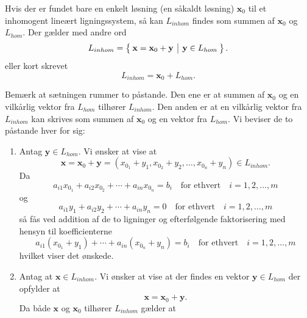 \begin{theorem}[Struktursætningen]\label{TN2.23b}
Hvis der er fundet bare en enkelt løsning (en såkaldt  løsning) $\mathbf x_0$ til et inhomogent lineært ligningssystem, så kan $L_{inhom}$ findes som summen af $\mathbf x_0$ og  $L_{hom}$.\bs
Der gælder med andre ord
\begin{equation}
L_{inhom}=\left\lbrace \hspace*{-1mm} \begin{array}{c|c} \mathbf x=\mathbf x_0+\mathbf y & \mathbf y \in L_{hom} \end{array} \hspace*{-1mm} \right\rbrace.
\end{equation}
eller kort skrevet
\begin{equation}\label{TN2.24}
L_{inhom}=\mathbf x_0+L_{hom}.
\end{equation}
\end{theorem}

\begin{bevis}
Bemærk at sætningen rummer to påstande. Den ene er at summen af $\mathbf x_0$ og en vilkårlig vektor fra $L_{hom}$ tilhører $L_{inhom}$. Den anden er at en vilkårlig vektor fra $L_{inhom}$ kan skrives som summen af $\mathbf x_0$ og en vektor fra $L_{hom}$. Vi beviser de to påstande hver for sig:
\begin{enumerate}
\item
Antag $\mathbf y \in L_{hom}$. Vi ønsker at vise at 
\begin{equation}
\mathbf x=\mathbf x_0+\mathbf y=(x_{0_1}+y_1, x_{0_2}+y_2,\ldots ,x_{0_n}+y_n) \in L_{inhom}.
\end{equation}
Da
\begin{equation}
a_{i1}x_{0_1}+a_{i2}x_{0_2}+ \cdots + a_{in}x_{0_n}=b_i \quad \textrm{for ethvert}\quad i=1,2,\ldots,m
\end{equation}
og
\begin{equation}
a_{i1}y_{1}+a_{i2}y_{2}+ \cdots + a_{in}y_{n}=0 \quad \textrm{for ethvert}\quad i=1,2,\ldots,m
\end{equation}
så fås ved addition af de to ligninger og efterfølgende faktorisering med hensyn til koefficienterne
\begin{equation}
a_{i1}(x_{0_1}+y_1) + \cdots + a_{in}(x_{0_n}+y_n) = b_i \quad \textrm{for ethvert} \quad i=1,2,\ldots,m
\end{equation}
hvilket viser det ønskede.
\item
Antag at $\mathbf x \in L_{inhom}$. Vi ønsker at vise at der findes en vektor  $\mathbf y \in L_{hom}$ der opfylder at
\begin{equation}
\mathbf x=\mathbf x_0+\mathbf y.
\end{equation}
Da både  $\mathbf x$ og  $\mathbf x_0$ tilhører $L_{inhom}$ gælder at

\end{enumerate}
\end{bevis}

